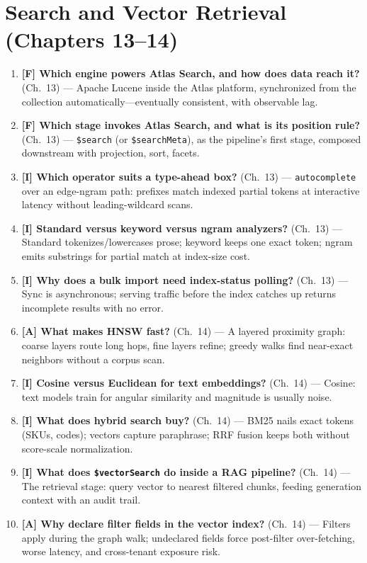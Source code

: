\section{Search and Vector Retrieval (Chapters 13--14)}
\begin{enumerate}
    \item \textbf{[F] Which engine powers Atlas Search, and how does data reach it?} (Ch.~13) --- Apache Lucene inside the Atlas platform, synchronized from the collection automatically---eventually consistent, with observable lag.
    \item \textbf{[F] Which stage invokes Atlas Search, and what is its position rule?} (Ch.~13) --- \texttt{\$search} (or \texttt{\$searchMeta}), as the pipeline's first stage, composed downstream with projection, sort, facets.
    \item \textbf{[I] Which operator suits a type-ahead box?} (Ch.~13) --- \texttt{autocomplete} over an edge-ngram path: prefixes match indexed partial tokens at interactive latency without leading-wildcard scans.
    \item \textbf{[I] Standard versus keyword versus ngram analyzers?} (Ch.~13) --- Standard tokenizes/lowercases prose; keyword keeps one exact token; ngram emits substrings for partial match at index-size cost.
    \item \textbf{[I] Why does a bulk import need index-status polling?} (Ch.~13) --- Sync is asynchronous; serving traffic before the index catches up returns incomplete results with no error.
    \item \textbf{[A] What makes HNSW fast?} (Ch.~14) --- A layered proximity graph: coarse layers route long hops, fine layers refine; greedy walks find near-exact neighbors without a corpus scan.
    \item \textbf{[I] Cosine versus Euclidean for text embeddings?} (Ch.~14) --- Cosine: text models train for angular similarity and magnitude is usually noise.
    \item \textbf{[I] What does hybrid search buy?} (Ch.~14) --- BM25 nails exact tokens (SKUs, codes); vectors capture paraphrase; RRF fusion keeps both without score-scale normalization.
    \item \textbf{[I] What does \texttt{\$vectorSearch} do inside a RAG pipeline?} (Ch.~14) --- The retrieval stage: query vector to nearest filtered chunks, feeding generation context with an audit trail.
    \item \textbf{[A] Why declare filter fields in the vector index?} (Ch.~14) --- Filters apply during the graph walk; undeclared fields force post-filter over-fetching, worse latency, and cross-tenant exposure risk.
\end{enumerate}

